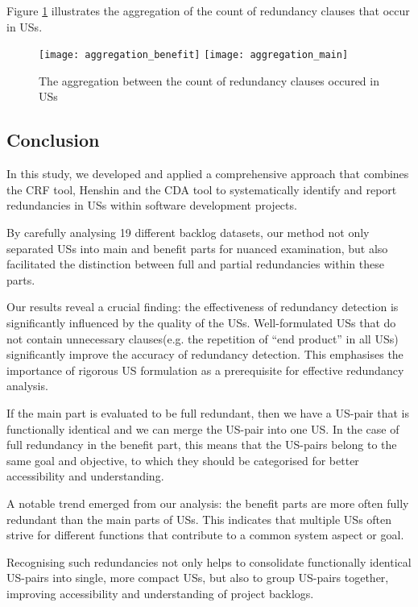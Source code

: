 Figure \ref{fig:aggregation} illustrates the aggregation of the count of redundancy clauses that occur in USs.

\begin{figure}[h]
	\center
	\texttt{[image: aggregation\_benefit]}
	\texttt{[image: aggregation\_main]}
	\caption{The aggregation between the count of redundancy clauses occured in USs}\label{fig:aggregation}
\end{figure} 
\subsection{Conclusion}\label{redundancy_conclustion}
In this study, we developed and applied a comprehensive approach that combines the CRF tool, Henshin and the CDA tool to systematically identify and report redundancies in USs within software development projects.

By carefully analysing 19 different backlog datasets, our method not only separated USs into main and benefit parts for nuanced examination, but also facilitated the distinction between full and partial redundancies within these parts.

Our results reveal a crucial finding: the effectiveness of redundancy detection is significantly influenced by the quality of the USs. Well-formulated USs that do not contain unnecessary clauses(e.g. the repetition of \enquote{end product} in all USs) significantly improve the accuracy of redundancy detection. This emphasises the importance of rigorous US formulation as a prerequisite for effective redundancy analysis.

 If the main part is evaluated to be full redundant, then we have a US-pair that is functionally identical and we can merge the US-pair into one US. In the case of full redundancy in the benefit part, this means that the US-pairs belong to the same goal and objective, to which they should be categorised for better accessibility and understanding.
 
A notable trend emerged from our analysis: the benefit parts are more often fully redundant than the main parts of USs. This indicates that multiple USs often strive for different functions that contribute to a common system aspect or goal.

Recognising such redundancies not only helps to consolidate functionally identical US-pairs into single, more compact USs, but also to group US-pairs together, improving accessibility and understanding of project backlogs.

